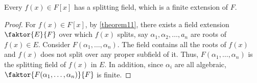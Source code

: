 \documentclass[11pt]{article}
\newcommand{\quotient}[2]{\faktor{#1}{#2}}
\begin{document}
\begin{theorem}
Every $f(x) \in F[x]$ has a splitting field, which is a finite extension of $F$.
\label{theorem12}
\end{theorem}
\begin{proof}
For $f(x) \in F[x]$, by \cref{theorem11}, there exists a field extension
$\quotient{E}{F}$ over which $f(x)$ splits, say $\alpha_1, \alpha_2, \dots, a_n$
are roots of $f(x) \in E$. Consider $F(\alpha_1,\dots,\alpha_n)$. The field
contains all the roots of $f(x)$ and $f(x)$ does not split over any proper
subfield of it. Thus, $F(\alpha_1,\dots,\alpha_n)$ is the splitting field of
$f(x)$ in $E$. In addition, since $\alpha_i$ are all algebraic,
$\quotient{F(\alpha_1,\dots,\alpha_n)}{F}$ is finite.
\end{proof}
\end{document}
